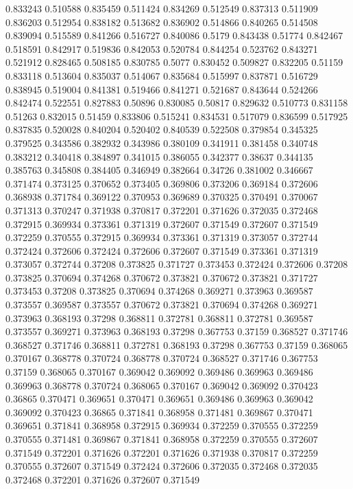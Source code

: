 0.833243 0.510588
0.835459 0.511424
0.834269 0.512549
0.837313 0.511909
0.836203 0.512954
0.838182 0.513682
0.836902 0.514866
0.840265 0.514508
0.839094 0.515589
0.841266 0.516727
0.840086 0.5179
0.843438 0.51774
0.842467 0.518591
0.842917 0.519836
0.842053 0.520784
0.844254 0.523762
0.843271 0.521912
0.828465 0.508185
0.830785 0.5077
0.830452 0.509827
0.832205 0.51159
0.833118 0.513604
0.835037 0.514067
0.835684 0.515997
0.837871 0.516729
0.838945 0.519004
0.841381 0.519466
0.841271 0.521687
0.843644 0.524266
0.842474 0.522551
0.827883 0.50896
0.830085 0.50817
0.829632 0.510773
0.831158 0.51263
0.832015 0.51459
0.833806 0.515241
0.834531 0.517079
0.836599 0.517925
0.837835 0.520028
0.840204 0.520402
0.840539 0.522508
0.379854 0.345325
0.379525 0.343586
0.382932 0.343986
0.380109 0.341911
0.381458 0.340748
0.383212 0.340418
0.384897 0.341015
0.386055 0.342377
0.38637 0.344135
0.385763 0.345808
0.384405 0.346949
0.382664 0.34726
0.381002 0.346667
0.371474 0.373125
0.370652 0.373405
0.369806 0.373206
0.369184 0.372606
0.368938 0.371784
0.369122 0.370953
0.369689 0.370325
0.370491 0.370067
0.371313 0.370247
0.371938 0.370817
0.372201 0.371626
0.372035 0.372468
0.372915 0.369934
0.373361 0.371319
0.372607 0.371549
0.372607 0.371549
0.372259 0.370555
0.372915 0.369934
0.373361 0.371319
0.373057 0.372744
0.372424 0.372606
0.372424 0.372606
0.372607 0.371549
0.373361 0.371319
0.373057 0.372744
0.37208 0.373825
0.371727 0.373453
0.372424 0.372606
0.37208 0.373825
0.370694 0.374268
0.370672 0.373821
0.370672 0.373821
0.371727 0.373453
0.37208 0.373825
0.370694 0.374268
0.369271 0.373963
0.369587 0.373557
0.369587 0.373557
0.370672 0.373821
0.370694 0.374268
0.369271 0.373963
0.368193 0.37298
0.368811 0.372781
0.368811 0.372781
0.369587 0.373557
0.369271 0.373963
0.368193 0.37298
0.367753 0.37159
0.368527 0.371746
0.368527 0.371746
0.368811 0.372781
0.368193 0.37298
0.367753 0.37159
0.368065 0.370167
0.368778 0.370724
0.368778 0.370724
0.368527 0.371746
0.367753 0.37159
0.368065 0.370167
0.369042 0.369092
0.369486 0.369963
0.369486 0.369963
0.368778 0.370724
0.368065 0.370167
0.369042 0.369092
0.370423 0.36865
0.370471 0.369651
0.370471 0.369651
0.369486 0.369963
0.369042 0.369092
0.370423 0.36865
0.371841 0.368958
0.371481 0.369867
0.370471 0.369651
0.371841 0.368958
0.372915 0.369934
0.372259 0.370555
0.372259 0.370555
0.371481 0.369867
0.371841 0.368958
0.372259 0.370555
0.372607 0.371549
0.372201 0.371626
0.372201 0.371626
0.371938 0.370817
0.372259 0.370555
0.372607 0.371549
0.372424 0.372606
0.372035 0.372468
0.372035 0.372468
0.372201 0.371626
0.372607 0.371549
